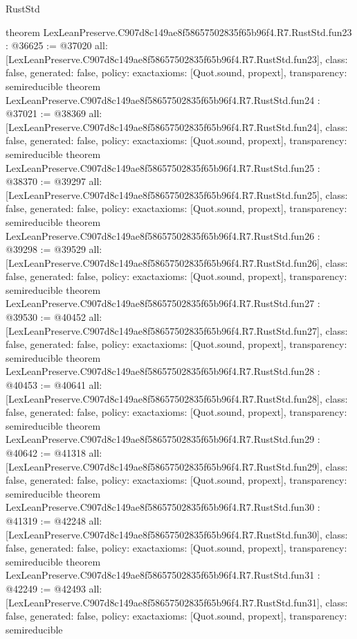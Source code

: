 \begin{lexlean}{RustStd}
\begin{coremodule}
{}
theorem LexLeanPreserve.C907d8c149ae8f58657502835f65b96f4.R7.RustStd.fun23 : @36625 := @37020 {
  all: [LexLeanPreserve.C907d8c149ae8f58657502835f65b96f4.R7.RustStd.fun23],
  class: false,
  generated: false,
  policy: exact{axioms: [Quot.sound, propext]},
  transparency: semireducible
}
theorem LexLeanPreserve.C907d8c149ae8f58657502835f65b96f4.R7.RustStd.fun24 : @37021 := @38369 {
  all: [LexLeanPreserve.C907d8c149ae8f58657502835f65b96f4.R7.RustStd.fun24],
  class: false,
  generated: false,
  policy: exact{axioms: [Quot.sound, propext]},
  transparency: semireducible
}
theorem LexLeanPreserve.C907d8c149ae8f58657502835f65b96f4.R7.RustStd.fun25 : @38370 := @39297 {
  all: [LexLeanPreserve.C907d8c149ae8f58657502835f65b96f4.R7.RustStd.fun25],
  class: false,
  generated: false,
  policy: exact{axioms: [Quot.sound, propext]},
  transparency: semireducible
}
theorem LexLeanPreserve.C907d8c149ae8f58657502835f65b96f4.R7.RustStd.fun26 : @39298 := @39529 {
  all: [LexLeanPreserve.C907d8c149ae8f58657502835f65b96f4.R7.RustStd.fun26],
  class: false,
  generated: false,
  policy: exact{axioms: [Quot.sound, propext]},
  transparency: semireducible
}
theorem LexLeanPreserve.C907d8c149ae8f58657502835f65b96f4.R7.RustStd.fun27 : @39530 := @40452 {
  all: [LexLeanPreserve.C907d8c149ae8f58657502835f65b96f4.R7.RustStd.fun27],
  class: false,
  generated: false,
  policy: exact{axioms: [Quot.sound, propext]},
  transparency: semireducible
}
theorem LexLeanPreserve.C907d8c149ae8f58657502835f65b96f4.R7.RustStd.fun28 : @40453 := @40641 {
  all: [LexLeanPreserve.C907d8c149ae8f58657502835f65b96f4.R7.RustStd.fun28],
  class: false,
  generated: false,
  policy: exact{axioms: [Quot.sound, propext]},
  transparency: semireducible
}
theorem LexLeanPreserve.C907d8c149ae8f58657502835f65b96f4.R7.RustStd.fun29 : @40642 := @41318 {
  all: [LexLeanPreserve.C907d8c149ae8f58657502835f65b96f4.R7.RustStd.fun29],
  class: false,
  generated: false,
  policy: exact{axioms: [Quot.sound, propext]},
  transparency: semireducible
}
theorem LexLeanPreserve.C907d8c149ae8f58657502835f65b96f4.R7.RustStd.fun30 : @41319 := @42248 {
  all: [LexLeanPreserve.C907d8c149ae8f58657502835f65b96f4.R7.RustStd.fun30],
  class: false,
  generated: false,
  policy: exact{axioms: [Quot.sound, propext]},
  transparency: semireducible
}
theorem LexLeanPreserve.C907d8c149ae8f58657502835f65b96f4.R7.RustStd.fun31 : @42249 := @42493 {
  all: [LexLeanPreserve.C907d8c149ae8f58657502835f65b96f4.R7.RustStd.fun31],
  class: false,
  generated: false,
  policy: exact{axioms: [Quot.sound, propext]},
  transparency: semireducible
}
\end{coremodule}
\end{lexlean}
